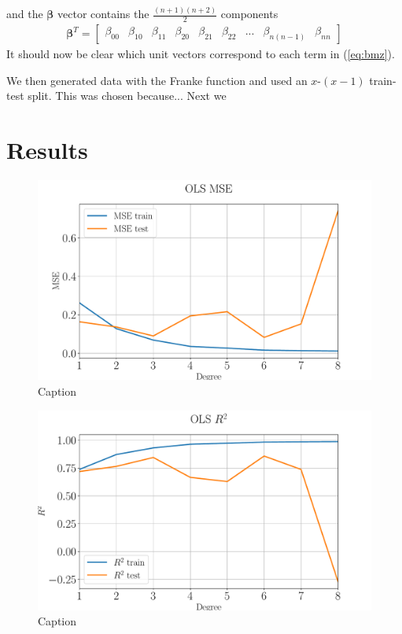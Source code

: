 \documentclass[%
reprint,
amsmath,amssymb,
aps,
pra,
]{revtex4-2}
\begin{document}
and the $\bm\beta$ vector contains the $\frac{(n+1)(n+2)}{2}$ components 
\begin{align*}
	\bm\beta^T=\begin{bmatrix}
		\beta_{00}&\beta_{10}&\beta_{11}&\beta_{20}&\beta_{21}&\beta_{22}&...&\beta_{n(n-1)}&\beta_{nn}
	\end{bmatrix}
\end{align*}
It should now be clear which unit vectors correspond to each term in (\ref{eq:bmz}).

We then generated data with the Franke function and used an $x$-$(x-1)$ train-test split. This was chosen because... Next we 
\section{Results}
\begin{figure}[ht!]
	\centering
	\includegraphics[width=\linewidth]{Python/Figures/OLS-MSE-degree.pdf}
	\caption{Caption}
	\label{fig:OLS_mse_degree}
\end{figure}
\begin{figure}[ht!]
	\centering
	\includegraphics[width=\linewidth]{Python/Figures/OLS-R2-degree.pdf}
	\caption{Caption}
	\label{fig:OLS_r2_degree}
\end{figure}
\end{document}
